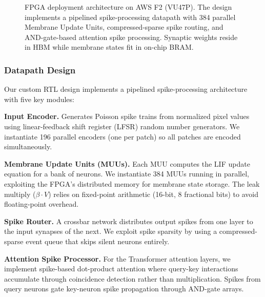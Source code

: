 \documentclass[11pt,a4paper]{article}
\begin{document}
\begin{figure}[!t]
{%
}
\caption{FPGA deployment architecture on AWS F2 (VU47P). The design implements a pipelined spike-processing datapath with 384 parallel Membrane Update Units, compressed-sparse spike routing, and AND-gate-based attention spike processing. Synaptic weights reside in HBM while membrane states fit in on-chip BRAM.}
\label{fig:fpga_arch}
\end{figure}

\subsubsection{Datapath Design}
Our custom RTL design implements a pipelined spike-processing architecture with five key modules:

\textbf{Input Encoder.} Generates Poisson spike trains from normalized pixel values using linear-feedback shift register (LFSR) random number generators. We instantiate 196 parallel encoders (one per patch) so all patches are encoded simultaneously.

\textbf{Membrane Update Units (MUUs).} Each MUU computes the LIF update equation for a bank of neurons. We instantiate 384 MUUs running in parallel, exploiting the FPGA's distributed memory for membrane state storage. The leak multiply ($\beta \cdot V$) relies on fixed-point arithmetic (16-bit, 8 fractional bits) to avoid floating-point overhead.

\textbf{Spike Router.} A crossbar network distributes output spikes from one layer to the input synapses of the next. We exploit spike sparsity by using a compressed-sparse event queue that skips silent neurons entirely.

\textbf{Attention Spike Processor.} For the Transformer attention layers, we implement spike-based dot-product attention where query-key interactions accumulate through coincidence detection rather than multiplication. Spikes from query neurons gate key-neuron spike propagation through AND-gate arrays.
\end{document}
